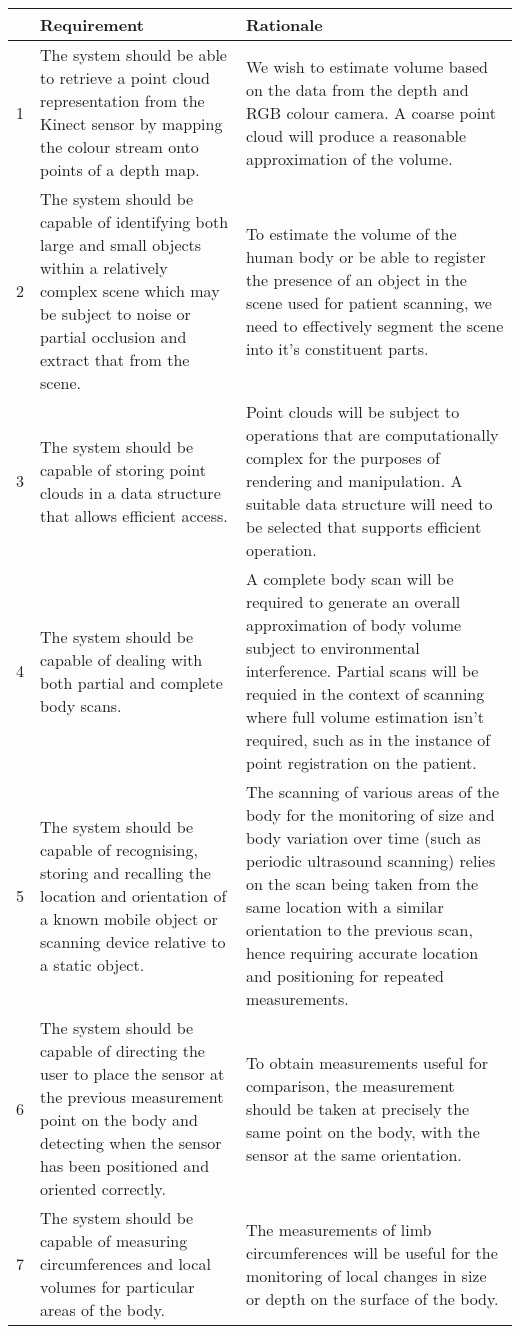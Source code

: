 \begin{longtable}{|p{0.5cm}|p{5cm}|p{6cm}|} \hline
   & Requirement & Rationale \\ \hline
  1 & The system should be able to retrieve a point cloud representation from the Kinect sensor by mapping the colour stream onto points of a depth map. &
    We wish to estimate volume based on the data from the depth and RGB colour camera. A coarse point cloud will produce a reasonable approximation of the volume. \\ \hline
      2 & The system should be capable of identifying both large and small objects within a relatively complex scene which may be subject to noise or partial occlusion and extract that from the scene. &
    To estimate the volume of the human body or be able to register the presence of an object in the scene used for patient scanning, we need to effectively segment the scene into it's constituent parts. \\ \hline
      3 & The system should be capable of storing point clouds in a data structure that allows efficient access. &
    Point clouds will be subject to operations that are computationally complex for the purposes of rendering and manipulation. A suitable data structure will need to be selected that supports efficient operation. \\ \hline
      4 & The system should be capable of dealing with both partial and complete body scans. &
    A complete body scan will be required to generate an overall approximation of body volume subject to environmental interference. Partial scans will be requied in the context of scanning where full volume estimation isn't required, such as in the instance of point registration on the patient. \\ \hline
      5 & The system should be capable of recognising, storing and recalling the location and orientation of a known mobile object or scanning device relative to a static object. &
    The scanning of various areas of the body for the monitoring of size and body variation over time (such as periodic ultrasound scanning) relies on the scan being taken from the same location with a similar orientation to the previous scan, hence requiring accurate location and positioning for repeated measurements. \\ \hline
      6 & The system should be capable of directing the user to place the sensor at the previous measurement point on the body and detecting when the sensor has been positioned and oriented correctly. &
    To obtain measurements useful for comparison, the measurement should be taken at precisely the same point on the body, with the sensor at the same orientation. \\ \hline
      7 & The system should be capable of measuring circumferences and local volumes for particular areas of the  body. &
    The measurements of limb circumferences will be useful for the monitoring of local changes in size or depth on the surface of the body. \\ \hline
    
\end{longtable}

